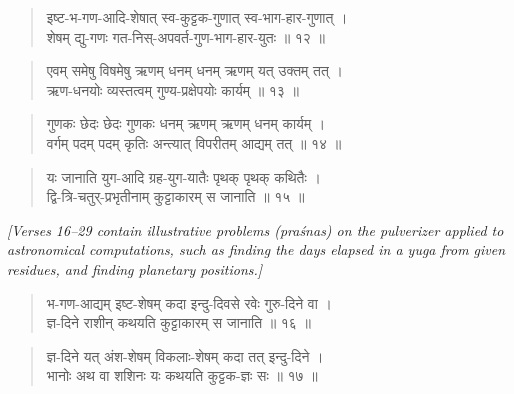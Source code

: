 \documentclass[11pt,a4paper]{article}
\newcommand{\cnote}[1]{\textcolor{notecolor}{\textit{#1}}}
\newenvironment{shloka}{\begin{verse}\devanagarifont\large}{\end{verse}}
\begin{document}
\vspace{0.3cm}

\begin{shloka}
इष्ट-भ-गण-आदि-शेषात् स्व-कुट्टक-गुणात् स्व-भाग-हार-गुणात् ।\\
शेषम् द्यु-गणः गत-निस्-अपवर्त-गुण-भाग-हार-युतः ॥ १२ ॥
\end{shloka}

\vspace{0.3cm}

\begin{shloka}
एवम् समेषु विषमेषु ऋणम् धनम् धनम् ऋणम् यत् उक्तम् तत् ।\\
ऋण-धनयोः व्यस्तत्वम् गुण्य-प्रक्षेपयोः कार्यम् ॥ १३ ॥
\end{shloka}

\vspace{0.3cm}

\begin{shloka}
गुणकः छेदः छेदः गुणकः धनम् ऋणम् ऋणम् धनम् कार्यम् ।\\
वर्गम् पदम् पदम् कृतिः अन्त्यात् विपरीतम् आद्यम् तत् ॥ १४ ॥
\end{shloka}

\vspace{0.3cm}

\begin{shloka}
यः जानाति युग-आदि ग्रह-युग-यातैः पृथक् पृथक् कथितैः ।\\
द्वि-त्रि-चतुर्-प्रभृतीनाम् कुट्टाकारम् स जानाति ॥ १५ ॥
\end{shloka}

\vspace{0.5cm}
\cnote{[Verses 16–29 contain illustrative problems
(\textit{praśna}s) on the pulverizer applied to astronomical
computations, such as finding the days elapsed in a yuga from given
residues, and finding planetary positions.]}
\vspace{0.3cm}

\begin{shloka}
भ-गण-आद्यम् इष्ट-शेषम् कदा इन्दु-दिवसे रवेः गुरु-दिने वा ।\\
ज्ञ-दिने राशीन् कथयति कुट्टाकारम् स जानाति ॥ १६ ॥
\end{shloka}

\vspace{0.3cm}

\begin{shloka}
ज्ञ-दिने यत् अंश-शेषम् विकलाः-शेषम् कदा तत् इन्दु-दिने ।\\
भानोः अथ वा शशिनः यः कथयति कुट्टक-ज्ञः सः ॥ १७ ॥
\end{shloka}
\end{document}
